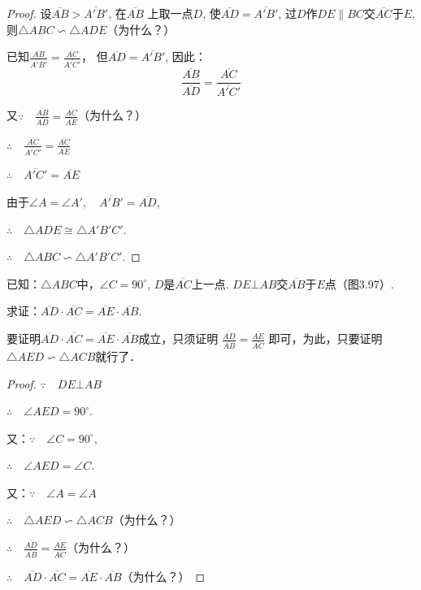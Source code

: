 \begin{proof}
设$\overline{AB}>\overline{A'B'}$, 在$\overline{AB}$
上取一点$D$, 
使$\overline{AD}=\overline{A'B'}$, 过$D$作$DE\parallel BC$交$\overline{AC}$于$E$, 则$\triangle ABC\backsim \triangle ADE$（为什么？）

已知$\frac{\overline{AB}}{\overline{A'B'}}=\frac{\overline{AC}}{\overline{A'C'}}$，
但$\overline{AD}=\overline{A'B'}$, 因此：
\[\frac{\overline{AB}}{\overline{AD}}=\frac{\overline{AC}}{\overline{A'C'}}\]

又$\because\quad \frac{\overline{AB}}{\overline{AD}}=\frac{\overline{AC}}{\overline{AE}}$（为什么？）

$\therefore\quad \frac{\overline{AC}}{\overline{A'C'}}=\frac{\overline{AC}}{\overline{AE}}$

$\therefore\quad \overline{A'C'}=\overline{AE}$

由于$\angle A=\angle A',\quad \overline{A'B'}=\overline{AD}$,

$\therefore\quad \triangle ADE\cong \triangle A'B'C'$.

$\therefore\quad \triangle ABC\backsim \triangle A'B'C'$.
\end{proof}

\begin{example}
    已知：$\triangle ABC$中，$\angle C=90^{\circ}$, $D$是$\overline{AC}$上一点. 
    $DE\bot AB$交$\overline{AB}$于$E$点（图3.97）.

    求证：$\overline{AD}\cdot \overline{AC}=\overline{AE}\cdot \overline{AB}$.
\end{example}

\begin{analyze}
    要证明$\overline{AD}\cdot \overline{AC}=\overline{AE}\cdot \overline{AB}$成立，只须证明
$\frac{\overline{AD}}{\overline{AB}}=\frac{\overline{AE}}{\overline{AC}}$
    即可，为此，只要证明$\triangle AED\backsim \triangle ACB$就行了．
\end{analyze}

\begin{proof}
$\because\quad DE\bot AB$

$\therefore\quad \angle AED=90^{\circ}$.

又：$\because\quad  \angle C=90^{\circ}$,

$\therefore\quad \angle AED=\angle C$.

又：$\because\quad \angle A=\angle A$

$\therefore\quad \triangle AED\backsim \triangle ACB$（为什么？）

$\therefore\quad \frac{\overline{AD}}{\overline{AB}}=\frac{\overline{AE}}{\overline{AC}}$（为什么？）

$\therefore\quad \overline{AD}\cdot \overline{AC}=\overline{AE}\cdot \overline{AB}$（为什么？）
\end{proof}

